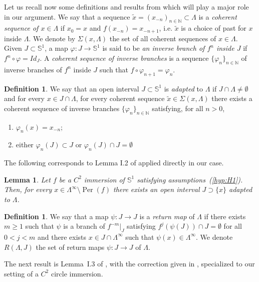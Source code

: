 \documentclass[12pt,a4paper,twoside]{article}
\theoremstyle{plain}
\newtheorem{lemma}[theorem]{Lemma}
\theoremstyle{definition}
\newtheorem{definition}[theorem]{Definition}
\newcommand{\N}{{\mathbb N}}
\newcommand{\per}{\operatorname{Per}(f)}
\newcommand{\tix}{\tilde{x}}
\begin{document}
Let us recall now some definitions and results from \cite{mane} which will play a major role in our argument. We say that a sequence $\tix=(x_{-n})_{n\in\N}\subset \Lambda$ is a \emph{coherent sequence of $x\in\Lambda$} if $x_0=x$ and $f(x_{-n})=x_{-n+1}$, i.e. $\tix$ is a choice of past for $x$ inside $\Lambda$. We denote by $\Sigma(x,\Lambda)$ the set of all coherent sequences of $x\in\Lambda$. Given $J\subset\mathbb{S}^1$, a map $\varphi: J\to\mathbb{S}^1$ is said to be \emph{an inverse branch of $f^n$ inside $J$} if $f^n\circ\varphi=Id_{J}$. A \emph{coherent sequence of inverse branches} is a sequence $\{\varphi_n\}_{n\in\N}$ of inverse branches of $f^n$ inside $J$ such that $f\circ\varphi_{n+1}=\varphi_n$.

\begin{definition}
We say that an open interval $J\subset\mathbb{S}^1$ is \emph{adapted} to $\Lambda$ if $J\cap\Lambda\neq\emptyset$ and for every $x\in J\cap\Lambda$, for every coherent sequence $\tix\in\Sigma(x,\Lambda)$ there exists a coherent sequence of inverse branches $\{\varphi_n\}_{n\in\N}$ satisfying, for all $n>0$,
\begin{enumerate}[label=(\Roman*)]
    \item $\varphi_n(x)=x_{-n}$;
    \item either $\varphi_n(J)\subset J$ or $\varphi_n(J)\cap J=\emptyset$
\end{enumerate}
\end{definition}

The following corresponds to Lemma I.2 of \cite{mane} applied directly in our case. 

\begin{lemma}
    \label{lem:maneI2}
Let $f$ be a $C^2$ immersion of $\mathbb{S}^1$ satisfying assumptions~\emph{(\ref{hyp:H1})}. Then, for every $x\in\Lambda^\infty\setminus\per$ there exists an open interval $J\supset\{x\}$ adapted to $\Lambda$.    
\end{lemma}

\begin{definition}
We say that a map
$\psi:J\to J$ is a \emph{return map} of $\Lambda$ if there exists
$m\ge 1$ such that $\psi$ is a branch of $f^{-m}|_J$ satisfying
$f^j(\psi(J))\cap J=\emptyset$ for all $0<j<m$ and there exists
$x\in J\cap\Lambda^\infty$ such that
$\psi(x)\in\Lambda^\infty$. We denote $R(\Lambda,J)$ the set of return maps $\psi:J\to J$ of $\Lambda$.
\end{definition}
 The next result is Lemma~I.3 of \cite{mane}, with the correction
given in \cite{mane-erratum}, specialized to our setting of a
$C^2$ circle immersion.
\end{document}
